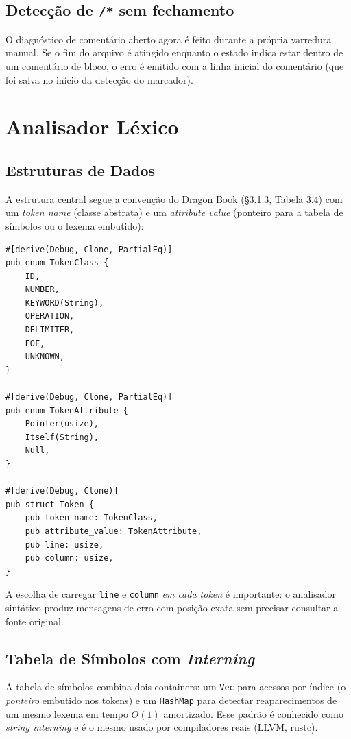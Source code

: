 \documentclass[12pt,a4paper]{article}
\begin{document}
\subsection{Detecção de \texttt{/*} sem fechamento}

O diagnóstico de comentário aberto agora é feito durante a própria
varredura manual. Se o fim do arquivo é atingido enquanto o estado
indica estar dentro de um comentário de bloco, o erro é emitido com a
linha inicial do comentário (que foi salva no início da detecção do
marcador).

\section{Analisador Léxico}

\subsection{Estruturas de Dados}

A estrutura central segue a convenção do Dragon Book
(\S3.1.3, Tabela 3.4) com um \emph{token name} (classe abstrata) e um
\emph{attribute value} (ponteiro para a tabela de símbolos ou o lexema
embutido):

\begin{lstlisting}[caption={\texttt{Token}, \texttt{TokenClass} e \texttt{TokenAttribute}}]
#[derive(Debug, Clone, PartialEq)]
pub enum TokenClass {
    ID,
    NUMBER,
    KEYWORD(String),
    OPERATION,
    DELIMITER,
    EOF,
    UNKNOWN,
}

#[derive(Debug, Clone, PartialEq)]
pub enum TokenAttribute {
    Pointer(usize),
    Itself(String),
    Null,
}

#[derive(Debug, Clone)]
pub struct Token {
    pub token_name: TokenClass,
    pub attribute_value: TokenAttribute,
    pub line: usize,
    pub column: usize,
}
\end{lstlisting}

A escolha de carregar \texttt{line} e \texttt{column} \emph{em cada
token} é importante: o analisador sintático produz mensagens de erro
com posição exata sem precisar consultar a fonte original.

\subsection{Tabela de Símbolos com \emph{Interning}}

A tabela de símbolos combina dois containers: um \texttt{Vec} para
acessos por índice (o \emph{ponteiro} embutido nos tokens) e um
\texttt{HashMap} para detectar reaparecimentos de um mesmo lexema em
tempo $O(1)$ amortizado. Esse padrão é conhecido como \emph{string
interning} e é o mesmo usado por compiladores reais (LLVM, rustc).
\end{document}
